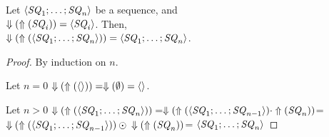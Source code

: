 \documentclass[numbers]{sigplanconf}
\begin{document}
\begin{lemma}
\label{lem:dnf-rx}
Let $\langle\mathit{SQ}_1;\ldots;\mathit{SQ}_n\rangle$ be a sequence,
and\\ $\Downarrow(\Uparrow(\mathit{SQ}_i))=\langle\mathit{SQ}_i\rangle$.
Then,\\ $\Downarrow(\Uparrow(\langle\mathit{SQ}_1;\ldots;\mathit{SQ}_n\rangle))=
\langle\mathit{SQ}_1;\ldots;\mathit{SQ}_n\rangle$.
\end{lemma}
\begin{proof}

By induction on $n$.

Let $n=0$
$\Downarrow(\Uparrow(\langle\rangle))=\Downarrow(\emptyset)=\langle\rangle$.

Let $n>0$
$\Downarrow(\Uparrow(\langle\mathit{SQ}_1;\ldots;\mathit{SQ}_n\rangle))=
\Downarrow(\Uparrow(\langle\mathit{SQ}_1;\ldots;\mathit{SQ}_{n-1}\rangle)
\cdot\Uparrow(\mathit{SQ}_n))$=
$\Downarrow(\Uparrow(\langle\mathit{SQ}_1;\ldots;\mathit{SQ}_{n-1}\rangle))
\odot\\\Downarrow(\Uparrow(\mathit{SQ}_n))$=
$\langle\mathit{SQ}_1;\ldots;\mathit{SQ}_n\rangle$
\end{proof}
\end{document}
